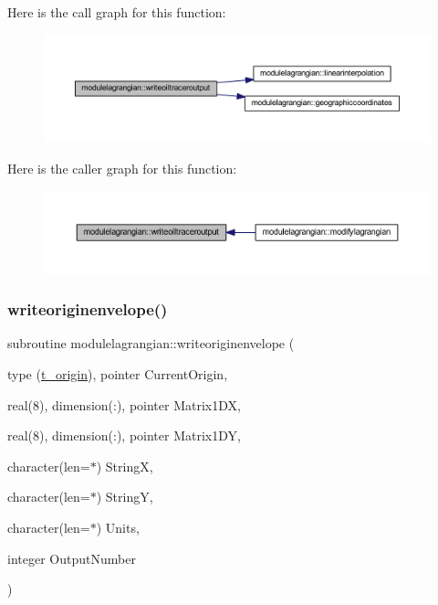Here is the call graph for this function\+:\nopagebreak
\begin{figure}[H]
\begin{center}
\leavevmode
\includegraphics[width=350pt]{namespacemodulelagrangian_af05b4830d15cd47fd3ed67c7bbffda15_cgraph}
\end{center}
\end{figure}
Here is the caller graph for this function\+:\nopagebreak
\begin{figure}[H]
\begin{center}
\leavevmode
\includegraphics[width=350pt]{namespacemodulelagrangian_af05b4830d15cd47fd3ed67c7bbffda15_icgraph}
\end{center}
\end{figure}
\mbox{\label{namespacemodulelagrangian_ad8e85e4295614bd67b14e48cf963619a}} 
\subsubsection{\texorpdfstring{writeoriginenvelope()}{writeoriginenvelope()}}
{\footnotesize\ttfamily subroutine modulelagrangian\+::writeoriginenvelope (\begin{DoxyParamCaption}\item[{type (\mbox{\hyperlink{structmodulelagrangian_1_1t__origin}{t\+\_\+origin}}), pointer}]{Current\+Origin,  }\item[{real(8), dimension(\+:), pointer}]{Matrix1\+DX,  }\item[{real(8), dimension(\+:), pointer}]{Matrix1\+DY,  }\item[{character(len=$\ast$)}]{StringX,  }\item[{character(len=$\ast$)}]{StringY,  }\item[{character(len=$\ast$)}]{Units,  }\item[{integer}]{Output\+Number }\end{DoxyParamCaption})\hspace{0.3cm}{\ttfamily [private]}}

